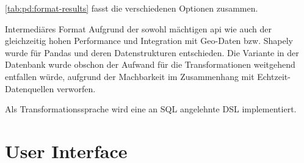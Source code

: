 \cref{tab:pd:format-results} fasst die verschiedenen Optionen zusammen.

\begin{decision}[label=dec:pd:format]{Intermediäres Format}
Aufgrund der sowohl mächtigen \acs{api} wie auch der gleichzeitig hohen Performance und Integration mit Geo-Daten bzw. Shapely wurde für Pandas und deren Datenstrukturen entschieden. Die Variante in der Datenbank wurde obschon der Aufwand für die Transformationen weitgehend entfallen würde, aufgrund der Machbarkeit im Zusammenhang mit Echtzeit-Datenquellen verworfen.

Als Transformationssprache wird eine an SQL angelehnte DSL implementiert.
\end{decision}

\section{User Interface}
